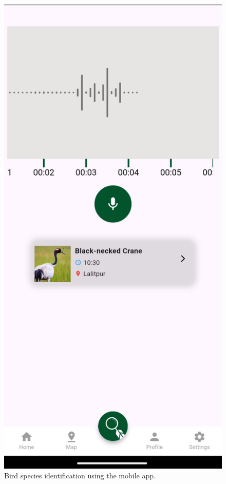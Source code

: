   \begin{figure}[h!]
      \centering
      \includegraphics[scale=0.4]{images/Identified.jpg}
      \caption{Bird species identification using the mobile app.}
  \end{figure}


